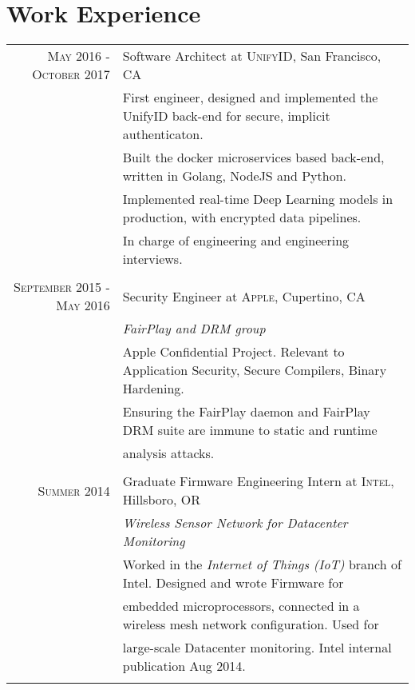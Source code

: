 \documentclass[lettersize,10pt]{article}
\begin{document}
\section{Work Experience}
\begin{tabular}{rl}
\textsc{ May 2016 - October 2017} & Software Architect at \textsc{UnifyID}, San Francisco, CA\\
&\footnotesize{First engineer, designed and implemented the UnifyID back-end for secure, implicit authenticaton. }\\
&\footnotesize{Built the docker microservices based back-end, written in Golang, NodeJS and Python. }\\
&\footnotesize{Implemented real-time Deep Learning models in production, with encrypted data pipelines. }\\
&\footnotesize{In charge of engineering and engineering interviews.}\\\multicolumn{2}{c}{} \\

\textsc{September 2015 - May 2016} & Security Engineer at \textsc{Apple}, Cupertino, CA \\&\emph{FairPlay and DRM group}\\
&\footnotesize{Apple Confidential Project. Relevant to Application Security, Secure Compilers, Binary Hardening.} \\
&\footnotesize{Ensuring the FairPlay daemon and FairPlay DRM suite are immune to static and runtime }\\
&\footnotesize{analysis attacks.}\\\multicolumn{2}{c}{} \\

\textsc{Summer 2014} & Graduate Firmware Engineering Intern at \textsc{Intel}, Hillsboro, OR \\&\emph{Wireless Sensor Network for Datacenter Monitoring}\\
&\footnotesize{Worked in the \textit{Internet of Things (IoT)} branch of Intel. Designed and wrote Firmware for} \\
&\footnotesize{embedded microprocessors, connected in a wireless mesh network configuration. Used for} \\
&\footnotesize{large-scale Datacenter monitoring. Intel internal publication Aug 2014.}\\\multicolumn{2}{c}{} \\
\end{tabular}

\end{document}
